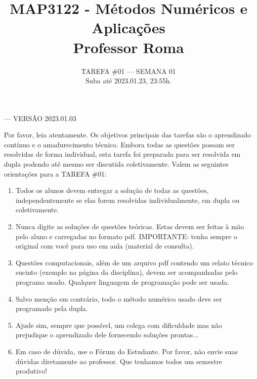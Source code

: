 \documentclass{article}
\title{MAP3122 - Métodos Numéricos e Aplicações\\ Professor Roma\\ }
\author{TAREFA \#01 --- SEMANA 01\\ Suba até 2023.01.23, 23:55h.}
\date{}
\begin{document}
\maketitle


    \vspace{-3mm}
    
    \mbox{}\hfill  --- VERSÃO 2023.01.03

\vspace{3mm}

Por favor, leia atentamente. Os objetivos principais das tarefas são o aprendizado contínuo e o amadurecimento técnico.
Embora todas as questões  possam ser resolvidas de forma individual, esta tarefa foi preparada para ser resolvida em dupla podendo até mesmo ser discutida coletivamente. Valem as seguintes orientações para a TAREFA \#01:

\begin{enumerate}
 
 \item Todos os alunos devem entregar a solução de todas as questões, independentemente se elas forem resolvidas individualmente, em dupla ou coletivamente.  
 \item Nunca digite as soluções de questões teóricas. Estas devem ser feitas à mão pelo aluno e carregadas no  formato pdf. IMPORTANTE: tenha sempre o original com você para uso em aula (material de consulta).
 \item Questões computacionais, além de um arquivo pdf contendo um relato técnico sucinto (exemplo na página da disciplina), devem ser acom\-panha\-das pelo programa usado. Qualquer linguagem de programação pode ser usada.
 \item Salvo menção em contrário, todo o método numérico usado deve ser programado pela dupla.
 \item Ajude sim, sempre que possível, um colega com dificuldade mas  não preju\-dique o aprendizado dele fornecendo soluções prontas...
 \item Em caso de dúvida, use o Fórum do Estudante. Por favor, não envie suas dúvidas diretamente ao professor.
 Que tenhamos todos um semestre produtivo!
\end{enumerate}
  
\end{document}
